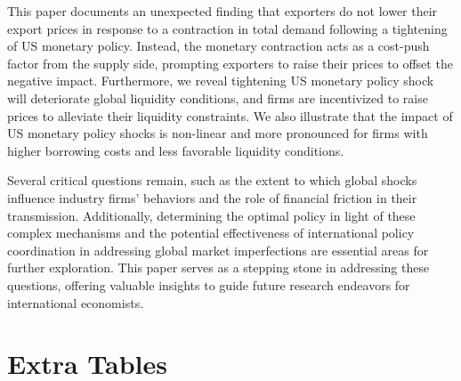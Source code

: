 This paper documents an unexpected finding that exporters do not lower their export prices in response to a contraction in total demand following a tightening of US monetary policy. Instead, the monetary contraction acts as a cost-push factor from the supply side, prompting exporters to raise their prices to offset the negative impact. Furthermore, we reveal tightening US monetary policy shock will deteriorate global liquidity conditions, and firms are incentivized to raise prices to alleviate their liquidity constraints. We also illustrate that the impact of US monetary policy shocks is non-linear and more pronounced for firms with higher borrowing costs and less favorable liquidity conditions.

Several critical questions remain, such as the extent to which global shocks influence industry firms' behaviors and the role of financial friction in their transmission. Additionally, determining the optimal policy in light of these complex mechanisms and the potential effectiveness of international policy coordination in addressing global market imperfections are essential areas for further exploration. This paper serves as a stepping stone in addressing these questions, offering valuable insights to guide future research endeavors for international economists.



\newpage


\newpage
\appendix

\section{Extra Tables}\label{Appendix-Tables}

\setcounter{table}{0}

\renewcommand{\thetable}{A\arabic{table}}




